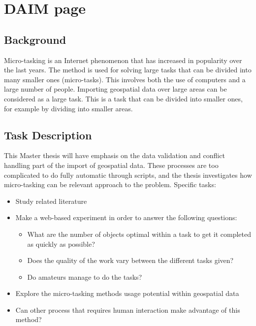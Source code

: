 \chapter*{DAIM page}

\section*{Background}
Micro-tasking is an Internet phenomenon that has increased in popularity over the last years. The method is used for solving large tasks that can be divided into many smaller ones (micro-tasks).  This involves both the use of computers and a large number of people. Importing geospatial data over large areas can be considered as a large task. This is a task that can be divided into smaller ones, for example by dividing into smaller areas.

\section*{Task Description}

This Master thesis will have emphasis on the data validation and conflict handling part of the import of geospatial data. These processes are too complicated to do fully automatic through scripts, and the thesis investigates how micro-tasking can be relevant approach to the problem.  
Specific tasks:
\begin{itemize}
	\item Study related literature
	\item Make a web-based experiment in order to answer the following questions:
	\begin{itemize}
		\item What are the number of objects optimal within a task to get it completed as quickly as possible?
		\item Does the quality of the work vary between the different tasks given?
		\item Do amateurs manage to do the tasks?
	\end{itemize}
	\item Explore the micro-tasking methods usage potential within geospatial data
	\item Can other process that requires human interaction make advantage of this method?
\end{itemize}


